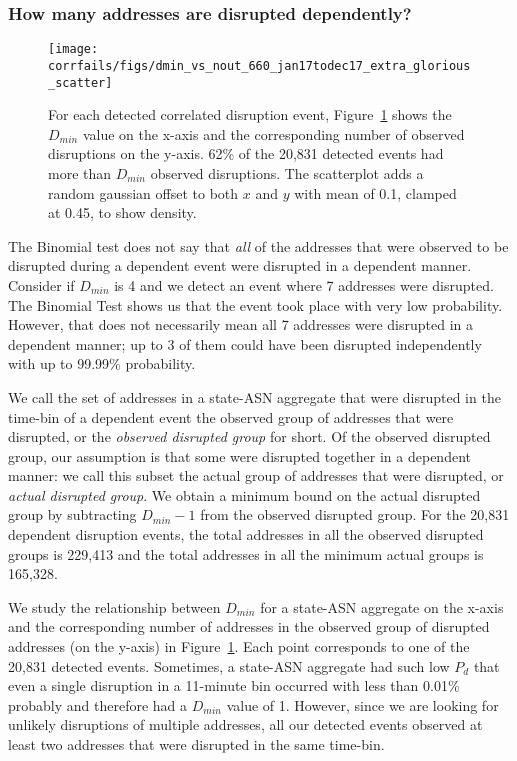 
\subsubsection*{How many addresses are disrupted dependently?}

\begin{figure}[t]
    \centering
    \texttt{[image: corrfails/figs/dmin\_vs\_nout\_660\_jan17todec17\_extra\_glorious\_scatter]}
   \caption[$D_{min}$ vs observed disruptions, for each
   detected dependent disruption event]{
   \label{fig:dmin_vs_nout}
For each detected correlated disruption event,
Figure~\ref{fig:dmin_vs_nout} shows the $D_{min}$ value on the x-axis and
the corresponding number of observed disruptions on the y-axis. 62\% of
the 20,831 detected events had more than $D_{min}$ observed
disruptions.  The scatterplot adds a random gaussian offset to both $x$ and $y$ with mean of 0.1, clamped at 0.45, to show density.
 }
\end{figure}
%
\hfill
%

The Binomial test does not say that \emph{all} of the
addresses that were observed to be disrupted during a dependent
event were disrupted in a dependent manner. Consider if $D_{min}$ is 4 and we
detect an event where 7 addresses were disrupted. The Binomial Test
shows us that the event took place with very low probability. However,
that does not necessarily mean all 7 addresses were disrupted in a dependent manner;
up to 3 of them could have been disrupted independently with up to 99.99\%
probability.

We call the set of addresses in a state-ASN aggregate that were
disrupted in the time-bin of a dependent event the observed
group of addresses that were disrupted, or the \emph{observed
  disrupted group} for short. Of the observed disrupted group, our assumption is that some were disrupted together in a
dependent manner: we call this subset the actual group of
addresses that were disrupted, or \emph{actual disrupted group}. We obtain a minimum bound on the actual
disrupted group by subtracting $D_{min} - 1$
from the observed disrupted group. For the 20,831 dependent disruption
events, the total addresses in all the observed disrupted groups is 229,413 and
the total addresses in all the minimum actual groups is 165,328.

We study the relationship between $D_{min}$ for a state-ASN
aggregate on the x-axis and the
corresponding number of addresses in the observed group of disrupted addresses (on the
y-axis) in Figure~\ref{fig:dmin_vs_nout}. Each point corresponds to one
of the 20,831 detected events. Sometimes, a state-ASN
aggregate had such low $P_d$ that even a single disruption in a
11-minute bin occurred with less than 0.01\% probably and therefore
had a $D_{min}$ value of 1. However, since we are looking for unlikely
disruptions of multiple addresses, all our detected events observed at
least two addresses that were disrupted in the same time-bin.

